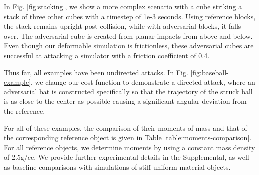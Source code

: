 In Fig. \ref{fig:stacking}, we show a more complex scenario with a cube striking a stack of three other cubes with a timestep of 1e-3 seconds. Using reference blocks, the stack remains upright post collision, while with adversarial blocks, it falls over. The adversarial cube is created from planar impacts from above and below. Even though our deformable simulation is frictionless, these adversarial cubes are successful at attacking a simulator with a friction coefficient of 0.4.

Thus far, all examples have been undirected attacks. In Fig. \ref{fig:baseball-example}, we change our cost function to demonstrate a directed attack, where an adversarial bat is constructed specifically so that the trajectory of the struck ball is as close to the center as possible causing a significant angular deviation from the reference.

For all of these examples, the comparison of their moments of mass and that of the corresponding reference object is given in Table \ref{table:moments-comparison}. For all reference objects, we determine moments by using a constant mass density of 2.5g/cc. We provide further experimental details in the Supplemental, as well as baseline comparisons with simulations of stiff uniform material objects.